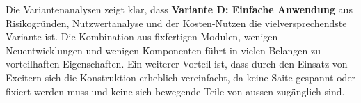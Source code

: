 Die Variantenanalysen zeigt klar, dass \textbf{Variante D: Einfache Anwendung} aus Risikogründen, Nutzwertanalyse und der Kosten-Nutzen die vielversprechendste Variante ist. Die Kombination aus fixfertigen Modulen, wenigen Neuentwicklungen und wenigen Komponenten führt in vielen Belangen zu vorteilhaften Eigenschaften. Ein weiterer Vorteil ist, dass durch den Einsatz von Excitern sich die Konstruktion erheblich vereinfacht, da keine Saite gespannt oder fixiert werden muss und keine sich bewegende Teile von aussen zugänglich sind.

%

